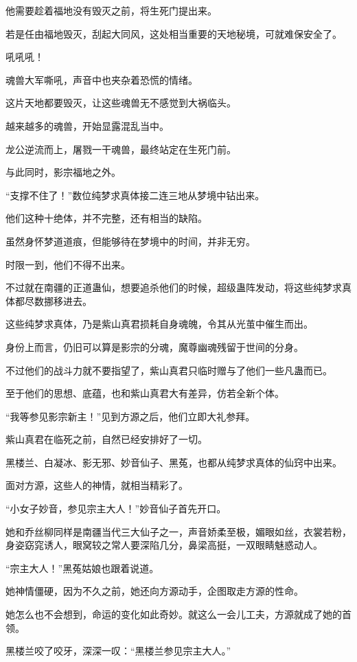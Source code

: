 \begin{this_body}
他需要趁着福地没有毁灭之前，将生死门提出来。

若是任由福地毁灭，刮起大同风，这处相当重要的天地秘境，可就难保安全了。

吼吼吼！

魂兽大军嘶吼，声音中也夹杂着恐慌的情绪。

这片天地都要毁灭，让这些魂兽无不感觉到大祸临头。

越来越多的魂兽，开始显露混乱当中。

龙公逆流而上，屠戮一干魂兽，最终站定在生死门前。

与此同时，影宗福地之外。

“支撑不住了！”数位纯梦求真体接二连三地从梦境中钻出来。

他们这种十绝体，并不完整，还有相当的缺陷。

虽然身怀梦道道痕，但能够待在梦境中的时间，并非无穷。

时限一到，他们不得不出来。

不过就在南疆的正道蛊仙，想要追杀他们的时候，超级蛊阵发动，将这些纯梦求真体都尽数挪移进去。

这些纯梦求真体，乃是紫山真君损耗自身魂魄，令其从光茧中催生而出。

身份上而言，仍旧可以算是影宗的分魂，魔尊幽魂残留于世间的分身。

不过他们的战斗力就不要指望了，紫山真君只临时赠与了他们一些凡蛊而已。

至于他们的思想、底蕴，也和紫山真君大有差异，仿若全新个体。

“我等参见影宗新主！”见到方源之后，他们立即大礼参拜。

紫山真君在临死之前，自然已经安排好了一切。

黑楼兰、白凝冰、影无邪、妙音仙子、黑菟，也都从纯梦求真体的仙窍中出来。

面对方源，这些人的神情，就相当精彩了。

“小女子妙音，参见宗主大人！”妙音仙子首先开口。

她和乔丝柳同样是南疆当代三大仙子之一，声音娇柔至极，媚眼如丝，衣裳若粉，身姿窈窕诱人，眼窝较之常人要深陷几分，鼻梁高挺，一双眼睛魅惑动人。

“宗主大人！”黑菟姑娘也跟着说道。

她神情僵硬，因为不久之前，她还向方源动手，企图取走方源的性命。

她怎么也不会想到，命运的变化如此奇妙。就这么一会儿工夫，方源就成了她的首领。

黑楼兰咬了咬牙，深深一叹：“黑楼兰参见宗主大人。”


\end{this_body}
